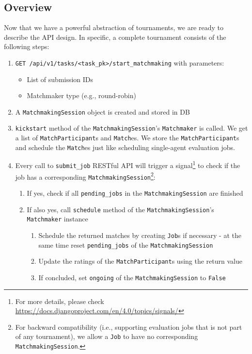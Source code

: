 \subsection{Overview}
\label{as:matchmaking-api_design-overview}
Now that we have a powerful abstraction of tournaments, we are ready to describe the API design. In specific, a complete tournament consists of the following steps:
\begin{enumerate}
    \item \texttt{GET /api/v1/tasks/<task\_pk>/start\_matchmaking} with parameters:
    \begin{itemize}
        \item List of submission IDs
        \item Matchmaker type (e.g., round-robin)
    \end{itemize}
    \item A \texttt{MatchmakingSession} object is created and stored in DB
    \item \texttt{kickstart} method of the \texttt{MatchmakingSession}'s \texttt{Matchmaker} is called. We get a list of \texttt{MatchParticipant}s and \texttt{Match}es. We store the \texttt{MatchParticipant}s and schedule the \texttt{Match}es just like scheduling single-agent evaluation jobs.
    \item Every call to \texttt{submit\_job} RESTful API will trigger a signal\footnote{For more details, please check \href{https://docs.djangoproject.com/en/4.0/topics/signals/}{https://docs.djangoproject.com/en/4.0/topics/signals/}} to check if the job has a corresponding \texttt{MatchmakingSession}\footnote{For backward compatibility (i.e., supporting evaluation jobs that is not part of any tournament), we allow a \texttt{Job} to have no corresponding \texttt{MatchmakingSession}.}:
    \begin{enumerate}
        \item If yes, check if all \texttt{pending\_jobs} in the \texttt{MatchmakingSession} are finished
        \item If also yes, call \texttt{schedule} method of the \texttt{MatchmakingSession}'s \texttt{Matchmaker} instance
        \begin{enumerate}
            \item Schedule the returned matches by creating \texttt{Job}s if necessary - at the same time reset \texttt{pending\_jobs} of the \texttt{MatchmakingSession}
            \item Update the ratings of the \texttt{MatchParticipant}s using the return value
            \item If concluded, set \texttt{ongoing} of the \texttt{MatchmakingSession} to \texttt{False}
        \end{enumerate}
    \end{enumerate}
\end{enumerate}

